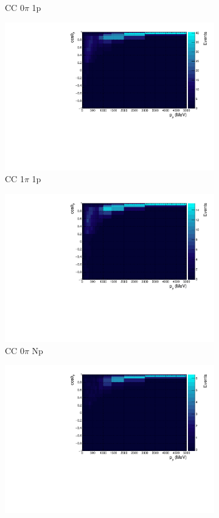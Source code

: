 \begin{figure}
\begin{subfigure}{.49\textwidth}
  \caption{CC 0$\pi$ 1p}
\end{subfigure}
\begin{subfigure}{.49\textwidth}
  \centering
  \includegraphics[width=0.9\linewidth]{figs/nd280_pmtmuu_cc1pi1p.pdf}
  \caption{CC 1$\pi$ 1p}
\end{subfigure}
\begin{subfigure}{.49\textwidth}
  \centering
  \includegraphics[width=0.9\linewidth]{figs/nd280_pmtmuu_cc0piNp.pdf}
  \caption{CC 0$\pi$ Np}
\end{subfigure}
\begin{subfigure}{.49\textwidth}
  \centering
  \includegraphics[width=0.9\linewidth]{figs/nd280_pmtmuu_cc1piNp.pdf}

\end{subfigure}
\end{figure}
